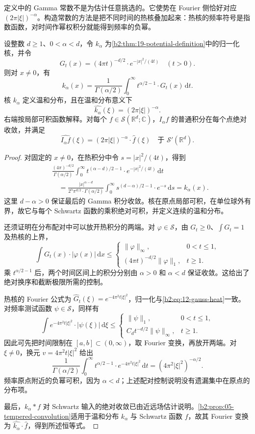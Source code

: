 定义中的 Gamma 常数不是为估计任意挑选的。它使势在 Fourier 侧恰好对应 \((2\pi|\xi|)^{-\alpha}\)。构造常数的方法是把不同时间的热核叠加起来：热核的频率符号是指数函数，对时间作幂权积分就能得到频率的负幂。
\begin{proposition}\label{b2:prop:19-riesz-heat}
设整数 \(d\geq1\)、\(0<\alpha<d\)，令 \(k_\alpha\) 为\cref{b2:thm:19-potential-definition}中的归一化核，并令
\[
 G_t(x)=(4\pi t)^{-d/2}\cdot e^{-|x|^2/(4t)}\quad(t>0).
\]
则对 \(x\ne0\)，有
\[
 k_\alpha(x)=\frac1{\Gamma(\alpha/2)}
 \int_0^\infty t^{\alpha/2-1}\cdot G_t(x)\,\mathrm dt.
\]
核 \(k_\alpha\) 定义温和分布，且在温和分布意义下
\[
 \widehat{k_\alpha}(\xi)=(2\pi|\xi|)^{-\alpha}.
\]
右端按局部可积函数解释。对每个 \(f\in\mathcal S(\mathbb R^d;\mathbb C)\)，\(I_\alpha f\) 的普通积分在每个点绝对收敛，并满足
\[
 \widehat{I_\alpha f}(\xi)
 =(2\pi|\xi|)^{-\alpha}\cdot\widehat f(\xi)
 \quad\text{于 }\mathcal S'(\mathbb R^d).
\]
\end{proposition}
\begin{proof}
对固定的 \(x\ne0\)，在热积分中令 \(s=|x|^2/(4t)\)，得到
\[
 \begin{aligned}
 &\frac{(4\pi)^{-d/2}}{\Gamma(\alpha/2)}
 \int_0^\infty t^{(\alpha-d)/2-1}\cdot e^{-|x|^2/(4t)}\,\mathrm dt\\
 &\quad=\frac{|x|^{\alpha-d}}
 {2^\alpha\pi^{d/2}\cdot\Gamma(\alpha/2)}
 \int_0^\infty s^{(d-\alpha)/2-1}\cdot e^{-s}\,\mathrm ds
 =k_\alpha(x).
 \end{aligned}
\]
这里 \(d-\alpha>0\) 保证最后的 Gamma 积分收敛。核在原点局部可积，在单位球外有界，故它与每个 Schwartz 函数的乘积绝对可积，并定义连续的温和分布。

还须证明在分布配对中可以放开热积分的两端。对 \(\varphi\in\mathcal S\)，由 \(G_t\geq0\)、\(\int G_t=1\) 及热核的上界，
\[
 \int G_t(x)\cdot|\varphi(x)|\,\mathrm dx
 \leq
 \begin{cases}
 \|\varphi\|_\infty,&0<t\leq1,\\
 (4\pi t)^{-d/2}\|\varphi\|_1,&t\geq1.
 \end{cases}
\]
乘 \(t^{\alpha/2-1}\) 后，两个时间区间上的积分分别由 \(\alpha>0\) 和 \(\alpha<d\) 保证收敛。这给出了绝对换序和截断极限所需的控制。

热核的 Fourier 公式为 \(\widehat G_t(\xi)=e^{-4\pi^2t|\xi|^2}\)，归一化与\eqref{b2:eq:12-gauss-heat}一致。对频率测试函数 \(\psi\in\mathcal S\)，同样有
\[
 \int e^{-4\pi^2t|\xi|^2}\cdot|\psi(\xi)|\,\mathrm d\xi
 \leq
 \begin{cases}
 \|\psi\|_1,&0<t\leq1,\\
 C_dt^{-d/2}\|\psi\|_\infty,&t\geq1.
 \end{cases}
\]
因此可先把时间限制在 \([a,b]\subset(0,\infty)\)，取 Fourier 变换，再放开两端。对 \(\xi\ne0\)，换元 \(v=4\pi^2t|\xi|^2\) 给出
\[
 \frac1{\Gamma(\alpha/2)}
 \int_0^\infty t^{\alpha/2-1}\cdot e^{-4\pi^2t|\xi|^2}\,\mathrm dt
 =(4\pi^2|\xi|^2)^{-\alpha/2}.
\]
频率原点附近的负幂可积，因为 \(\alpha<d\)；上述配对控制说明没有遗漏集中在原点的分布项。

最后，\(k_\alpha*f\) 对 Schwartz 输入的绝对收敛已由近远场估计说明。\cref{b2:prop:05-tempered-convolution}适用于温和分布 \(k_\alpha\) 与 Schwartz 函数 \(f\)，故其 Fourier 变换为 \(\widehat{k_\alpha}\cdot\widehat f\)，得到所述恒等式。
\end{proof}
